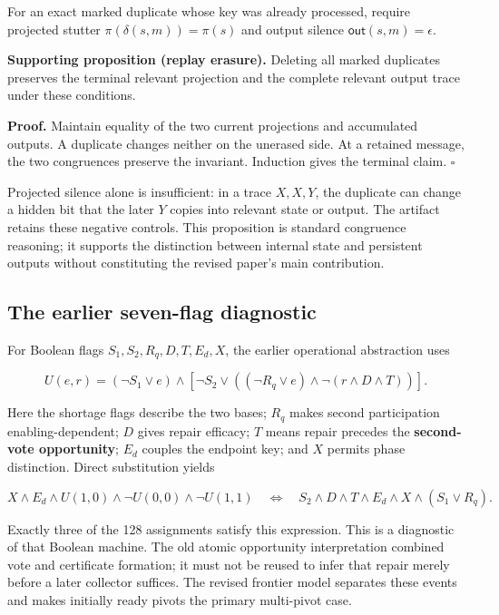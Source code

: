 For an exact marked duplicate whose key was already processed, require
projected stutter \(\pi(\delta(s,m))=\pi(s)\) and output silence
\(\mathsf{out}(s,m)=\epsilon\).

\textbf{Supporting proposition (replay erasure).} Deleting all marked
duplicates preserves the terminal relevant projection and the complete
relevant output trace under these conditions.

\textbf{Proof.} Maintain equality of the two current projections and
accumulated outputs. A duplicate changes neither on the unerased side.
At a retained message, the two congruences preserve the invariant.
Induction gives the terminal claim. \(\square\)

Projected silence alone is insufficient: in a trace \(X,X,Y\), the
duplicate can change a hidden bit that the later \(Y\) copies into
relevant state or output. The artifact retains these negative controls.
This proposition is standard congruence reasoning; it supports the
distinction between internal state and persistent outputs without
constituting the revised paper's main contribution.

\subsection{The earlier seven-flag
diagnostic}\label{the-earlier-seven-flag-diagnostic}

For Boolean flags \(S_1,S_2,R_q,D,T,E_d,X\), the earlier operational
abstraction uses

\[
U(e,r)=(\neg S_1\lor e)\land
[\neg S_2\lor((\neg R_q\lor e)\land\neg(r\land D\land T))].
\]

Here the shortage flags describe the two bases; \(R_q\) makes second
participation enabling-dependent; \(D\) gives repair efficacy; \(T\)
means repair precedes the \textbf{second-vote opportunity}; \(E_d\)
couples the endpoint key; and \(X\) permits phase distinction. Direct
substitution yields

\[
X\land E_d\land U(1,0)\land\neg U(0,0)\land\neg U(1,1)
\quad\Longleftrightarrow\quad
S_2\land D\land T\land E_d\land X\land(S_1\lor R_q).
\]

Exactly three of the 128 assignments satisfy this expression. This is a
diagnostic of that Boolean machine. The old atomic opportunity
interpretation combined vote and certificate formation; it must not be
reused to infer that repair merely before a later collector suffices.
The revised frontier model separates these events and makes initially
ready pivots the primary multi-pivot case.

